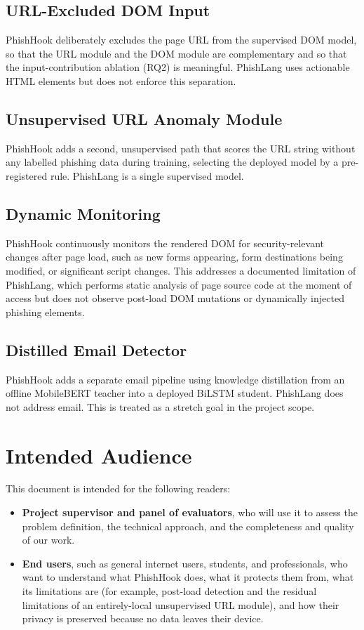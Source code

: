 \documentclass{FastFyp}
\begin{document}
\subsection{URL-Excluded DOM Input}
PhishHook deliberately excludes the page URL from the supervised DOM model, so that the URL module and the DOM module are complementary and so that the input-contribution ablation (RQ2) is meaningful. PhishLang uses actionable HTML elements but does not enforce this separation.

\subsection{Unsupervised URL Anomaly Module}
PhishHook adds a second, unsupervised path that scores the URL string without any labelled phishing data during training, selecting the deployed model by a pre-registered rule. PhishLang is a single supervised model.

\subsection{Dynamic Monitoring}
PhishHook continuously monitors the rendered DOM for security-relevant changes after page load, such as new forms appearing, form destinations being modified, or significant script changes. This addresses a documented limitation of PhishLang, which performs static analysis of page source code at the moment of access but does not observe post-load DOM mutations or dynamically injected phishing elements.

\subsection{Distilled Email Detector}
PhishHook adds a separate email pipeline using knowledge distillation from an offline MobileBERT teacher into a deployed BiLSTM student. PhishLang does not address email. This is treated as a stretch goal in the project scope.

\section{Intended Audience}
This document is intended for the following readers:
\begin{itemize}
    \item \textbf{Project supervisor and panel of evaluators}, who will use it to assess the problem definition, the technical approach, and the completeness and quality of our work.

    \item \textbf{End users}, such as general internet users, students, and professionals, who want to understand what PhishHook does, what it protects them from, what its limitations are (for example, post-load detection and the residual limitations of an entirely-local unsupervised URL module), and how their privacy is preserved because no data leaves their device.
 

\end{itemize}
\end{document}
